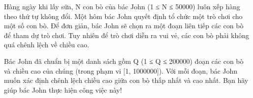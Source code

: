 Hàng ngày khi lấy sữa, N con bò của bác John (1 ≤ N ≤ 50000) luôn xếp hàng theo thứ tự không đổi. Một hôm bác John quyết định tổ chức một trò chơi cho một số con bò. Để đơn giản, bác John sẽ   chọn ra một đoạn liên tiếp các con bò để tham dự trò chơi. Tuy nhiên để trò chơi diễn ra vui vẻ, các con bò phải không quá chênh lệch về chiều cao.  

   Bác John đã chuẩn bị một danh sách gồm Q (1 ≤ Q ≤ 200000) đoạn các con bò và chiều cao của chúng (trong phạm vi [1, 1000000]). Với mỗi đoạn, bác John muốn xác định chênh lệch chiều cao giữa   con bò thấp nhất và cao nhất. Bạn hãy giúp bác John thực hiện công việc này!  

\